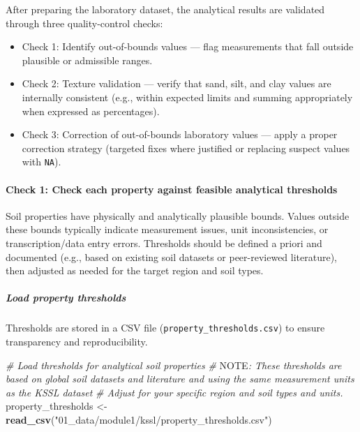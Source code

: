 \documentclass[
  10pt,
  b5paper,
  oneside]{book}
\newenvironment{Shaded}{\begin{snugshade}}{\end{snugshade}}
\newcommand{\AlertTok}[1]{\textcolor[rgb]{0.94,0.16,0.16}{#1}}
\newcommand{\CommentTok}[1]{\textcolor[rgb]{0.56,0.35,0.01}{\textit{#1}}}
\newcommand{\FunctionTok}[1]{\textcolor[rgb]{0.13,0.29,0.53}{\textbf{#1}}}
\newcommand{\NormalTok}[1]{#1}
\newcommand{\OtherTok}[1]{\textcolor[rgb]{0.56,0.35,0.01}{#1}}
\newcommand{\StringTok}[1]{\textcolor[rgb]{0.31,0.60,0.02}{#1}}
\begin{document}
After preparing the laboratory dataset, the analytical results are validated through three quality-control checks:

\begin{itemize}
\item
  Check 1: Identify out-of-bounds values --- flag measurements that fall outside plausible or admissible ranges.
\item
  Check 2: Texture validation --- verify that sand, silt, and clay values are internally consistent (e.g., within expected limits and summing appropriately when expressed as percentages).
\item
  Check 3: Correction of out-of-bounds laboratory values --- apply a proper correction strategy (targeted fixes where justified or replacing suspect values with \texttt{NA}).
\end{itemize}

\paragraph*{Check 1: Check each property against feasible analytical thresholds}\label{check-1-check-each-property-against-feasible-analytical-thresholds}

Soil properties have physically and analytically plausible bounds. Values outside these bounds typically indicate measurement issues, unit inconsistencies, or transcription/data entry errors. Thresholds should be defined a priori and documented (e.g., based on existing soil datasets or peer-reviewed literature), then adjusted as needed for the target region and soil types.

\subparagraph*{Load property thresholds}\label{load-property-thresholds}

Thresholds are stored in a CSV file (\texttt{property\_thresholds.csv}) to ensure transparency and reproducibility.

\begin{Shaded}
\begin{Highlighting}[]
\CommentTok{\# Load thresholds for analytical soil properties}
\CommentTok{\# }\AlertTok{NOTE}\CommentTok{: These thresholds are based on global soil datasets and literature and using the same measurement units as the KSSL dataset}
\CommentTok{\#       Adjust for your specific region and soil types and units.}
\NormalTok{property\_thresholds }\OtherTok{\textless{}{-}} \FunctionTok{read\_csv}\NormalTok{(}\StringTok{"01\_data/module1/kssl/property\_thresholds.csv"}\NormalTok{)}
\end{Highlighting}
\end{Shaded}
\end{document}
